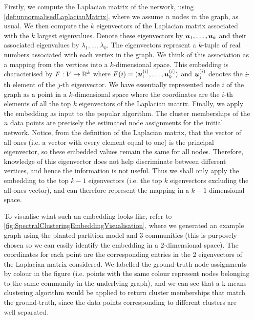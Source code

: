 Firstly, we compute the Laplacian matrix of the network, using \cref{def:unnormalisedLaplacianMatrix}, where we assume $n$ nodes in the graph, as usual.
We then compute the $k$ eigenvectors of the Laplacian matrix associated with the $k$ largest eigenvalues.
Denote these eigenvectors by $\vecvar{u}_{1},\dots,\vecvar{u}_{k}$ and their associated eigenvalues by $\lambda_{1},\dots,\lambda_{k}$.
The eigenvectors represent a $k$-tuple of real numbers associated with each vertex in the graph. 
We think of this association as a mapping from the vertices into a $k$-dimensional space.
This embedding is characterised by $F : V \rightarrow \mathbb{R}^{k}$ where $F(i) = (\vecvar{u}_{1}^{(i)},\dots,\vecvar{u}_{k}^{(i)})$ and $\vecvar{u}_{j}^{(i)}$ denotes the $i$-th element of the $j$-th eigenvector.
We have essentially represented node $i$ of the graph as a point in a $k$-dimensional space where the coordinates are the $i$-th elements of all the top $k$ eigenvectors of the Laplacian matrix.
Finally, we apply the embedding as input to the popular  algorithm.
The cluster memberships of the $n$ data points are precisely the estimated node assignments for the initial network.
Notice, from the definition of the Laplacian matrix, that the vector of all ones (i.e. a vector with every element equal to one) is the principal eigenvector, so these embedded values remain the same for all nodes.
Therefore, knowledge of this eigenvector does not help discriminate between different vertices, and hence the information is not useful.
Thus we shall only apply the embedding to the top $k-1$ eigenvectors (i.e. the top $k$ eigenvectors excluding the all-ones vector), and can therefore represent the mapping in a $k-1$ dimensional space.

To visualise what such an embedding looks like, refer to \cref{fig:SpectralClusteringEmbeddingVisualisation}, where we generated an example graph using the planted partition model and 3 communities (this is purposely chosen so we can easily identify the embedding in a 2-dimensional space).
The coordinates for each point are the corresponding entries in the 2 eigenvectors of the Laplacian matrix considered.
We labelled the ground-truth node assignments by colour in the figure (i.e. points with the same colour represent nodes belonging to the same community in the underlying graph), and we can see that a k-means clustering algorithm would be applied to return cluster memberships that match the ground-truth, since the data points corresponding to different clusters are well separated.

